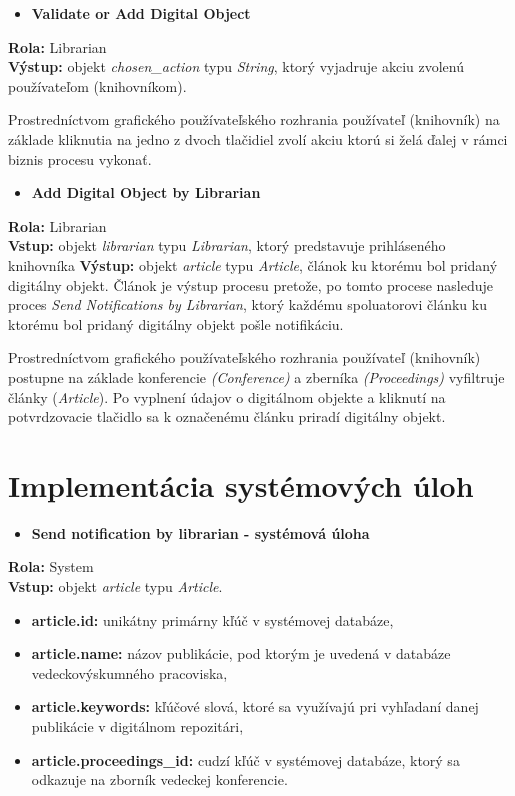 \documentclass[10pt,oneside,slovak,a4paper]{article}
\begin{document}
\begin{itemize}
\item \textbf{Validate or Add Digital Object}
\end{itemize}

\textbf{Rola:} Librarian\\
\textbf{Výstup:} objekt \textit{chosen\_action} typu \textit{String}, ktorý vyjadruje akciu zvolenú používateľom (knihovníkom).

Prostredníctvom grafického používateľského rozhrania používateľ (knihovník) na základe kliknutia na jedno z dvoch tlačidiel zvolí akciu ktorú si želá ďalej v rámci biznis procesu vykonať.

\begin{itemize}
\item \textbf{Add Digital Object by Librarian}
\end{itemize}

\textbf{Rola:} Librarian\\
\textbf{Vstup:} objekt \textit{librarian} typu \textit{Librarian},  ktorý predstavuje prihláseného knihovníka
\textbf{Výstup:} objekt \textit{article} typu \textit{Article}, článok ku ktorému bol pridaný digitálny objekt. Článok je výstup procesu pretože, po tomto procese nasleduje proces \textit{Send Notifications by Librarian}, ktorý každému spoluatorovi článku ku ktorému bol pridaný digitálny objekt pošle notifikáciu.

Prostredníctvom grafického používateľského rozhrania používateľ (knihovník) postupne na základe konferencie \textit{(Conference)} a zberníka \textit{(Proceedings)} vyfiltruje články (\textit{Article}). Po vyplnení údajov o digitálnom objekte a kliknutí na potvrdzovacie tlačidlo sa k označenému článku priradí digitálny objekt.

\section{Implementácia systémových úloh}

\begin{itemize}
\item \textbf{Send notification by librarian - systémová úloha}
\end{itemize}

\textbf{Rola:} System\\
\textbf{Vstup:} objekt \textit{article} typu \textit{Article}.

\begin{itemize}
\item \textbf{article.id:} unikátny primárny kľúč v systémovej databáze,
\item \textbf{article.name:} názov publikácie, pod ktorým je uvedená v databáze vedeckovýskumného pracoviska,
\item \textbf{article.keywords:} kľúčové slová, ktoré sa využívajú pri vyhľadaní danej publikácie v digitálnom repozitári,
\item \textbf{article.proceedings\_id:} cudzí kľúč v systémovej databáze, ktorý sa odkazuje na zborník vedeckej konferencie.
\end{itemize}
\end{document}
